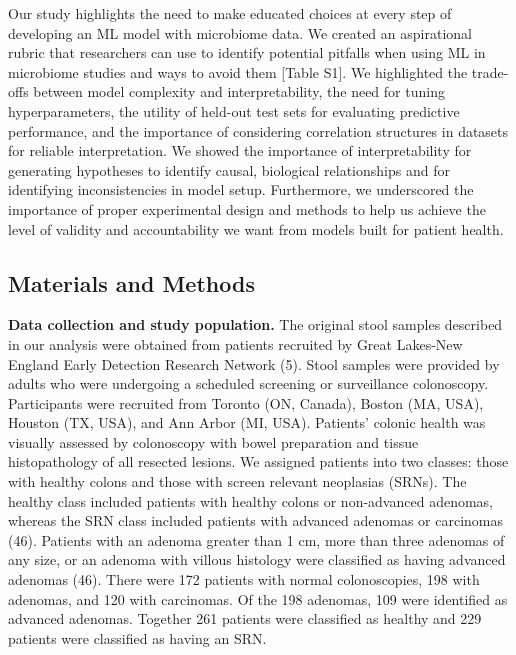 \documentclass[
  11pt,
]{article}
\begin{document}
Our study highlights the need to make educated choices at every step of
developing an ML model with microbiome data. We created an aspirational
rubric that researchers can use to identify potential pitfalls when
using ML in microbiome studies and ways to avoid them {[}Table S1{]}. We
highlighted the trade-offs between model complexity and
interpretability, the need for tuning hyperparameters, the utility of
held-out test sets for evaluating predictive performance, and the
importance of considering correlation structures in datasets for
reliable interpretation. We showed the importance of interpretability
for generating hypotheses to identify causal, biological relationships
and for identifying inconsistencies in model setup. Furthermore, we
underscored the importance of proper experimental design and methods to
help us achieve the level of validity and accountability we want from
models built for patient health.

\hypertarget{materials-and-methods}{%
\subsection{Materials and Methods}\label{materials-and-methods}}

\textbf{Data collection and study population.} The original stool
samples described in our analysis were obtained from patients recruited
by Great Lakes-New England Early Detection Research Network (5). Stool
samples were provided by adults who were undergoing a scheduled
screening or surveillance colonoscopy. Participants were recruited from
Toronto (ON, Canada), Boston (MA, USA), Houston (TX, USA), and Ann Arbor
(MI, USA). Patients' colonic health was visually assessed by colonoscopy
with bowel preparation and tissue histopathology of all resected
lesions. We assigned patients into two classes: those with healthy
colons and those with screen relevant neoplasias (SRNs). The healthy
class included patients with healthy colons or non-advanced adenomas,
whereas the SRN class included patients with advanced adenomas or
carcinomas (46). Patients with an adenoma greater than 1 cm, more than
three adenomas of any size, or an adenoma with villous histology were
classified as having advanced adenomas (46). There were 172 patients
with normal colonoscopies, 198 with adenomas, and 120 with carcinomas.
Of the 198 adenomas, 109 were identified as advanced adenomas. Together
261 patients were classified as healthy and 229 patients were classified
as having an SRN.
\end{document}
